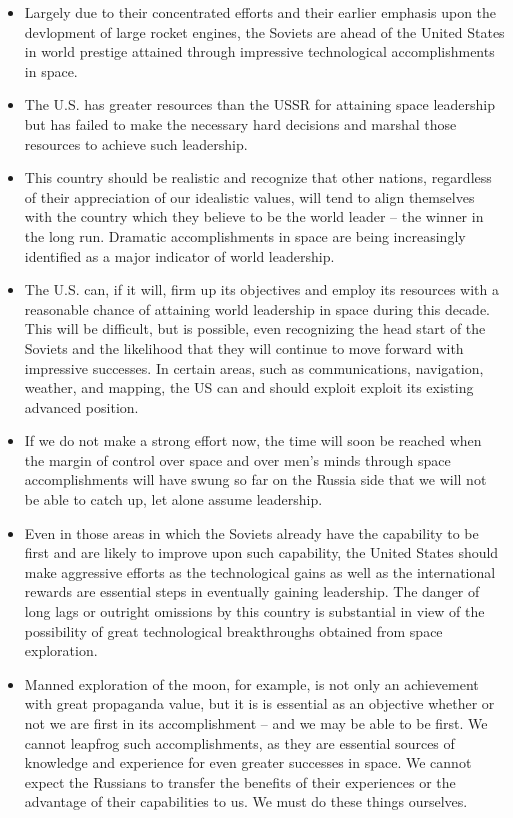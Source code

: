 \documentclass[letterpaper,11pt]{texMemo}
\begin{document}
\begin{itemize}
 \item Largely due to their concentrated efforts and their earlier emphasis upon the devlopment of large rocket engines, the Soviets are ahead of the United States in world prestige attained through impressive technological accomplishments in space.
 \item The U.S. has greater resources than the USSR for attaining space leadership but has failed to make the necessary hard decisions and marshal those resources to achieve such leadership.
 \item This country should be realistic and recognize that other nations, regardless of their appreciation of our idealistic values, will tend to align themselves with the country which they believe to be the world leader -- the winner in the long run.  Dramatic accomplishments in space are being increasingly identified as a major indicator of world leadership.
 \item The U.S. can, if it will, firm up its objectives and employ its resources with a reasonable chance of attaining world leadership in space during this decade.  This will be difficult, but is possible, even recognizing the head start of the Soviets and the likelihood that they will continue to move forward with impressive successes.  In certain areas, such as communications, navigation, weather, and mapping, the US can and should exploit exploit its existing advanced position.
 \item If we do not make a strong effort now, the time will soon be reached when the margin of control over space and over men's minds through space accomplishments will have swung so far on the Russia side that we will not be able to catch up, let alone assume leadership.
 \item Even in those areas in which the Soviets already have the capability to be first and are likely to improve upon such capability, the United States should make aggressive efforts as the technological gains as well as the international rewards are essential steps in eventually gaining leadership.  The danger of long lags or outright omissions by this country is substantial in view of the possibility of great technological breakthroughs obtained from space exploration.
 \item Manned exploration of the moon, for example, is not only an achievement with great propaganda value, but it is is essential as an objective whether or not we are first in its accomplishment -- and we may be able to be first.  We cannot leapfrog such accomplishments, as they are essential sources of knowledge and experience for even greater successes in space.  We cannot expect the Russians to transfer the benefits of their experiences or the advantage of their capabilities to us.  We must do these things ourselves.

\end{itemize}
\end{document}
